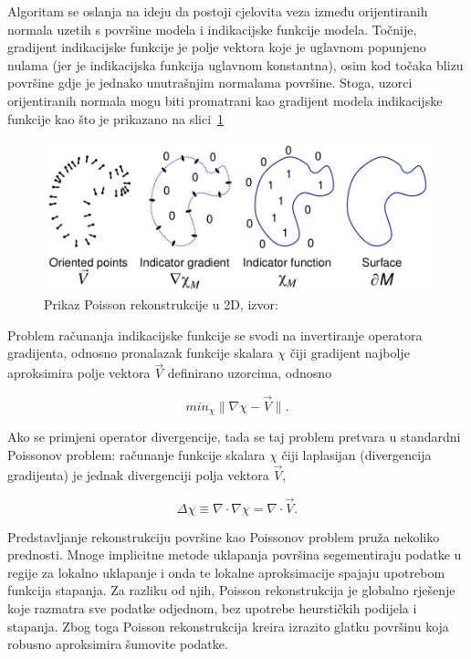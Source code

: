 Algoritam se oslanja na ideju da postoji cjelovita veza između
orijentiranih normala uzetih s površine modela i indikacijske funkcije
modela. Točnije, gradijent indikacijske funkcije je polje vektora koje
je uglavnom popunjeno nulama (jer je indikacijska funkcija uglavnom
konstantna), osim kod točaka blizu površine gdje je jednako unutrašnjim
normalama površine. Stoga, uzorci orijentiranih normala mogu biti
promatrani kao gradijent modela indikacijske funkcije kao što je
prikazano na slici~\ref{fig:poisson-reconstruction.png}

\begin{figure}[h]
\centering
\includegraphics[scale=0.35]{figures/poisson-reconstruction.png}
\caption[]{Prikaz Poisson rekonstrukcije u 2D,
    izvor:~\cite{Kazhdan:2006}}
\label{fig:poisson-reconstruction.png}
\end{figure}

Problem računanja indikacijske funkcije se svodi na invertiranje
operatora gradijenta, odnosno pronalazak funkcije skalara \(\chi\) čiji
gradijent najbolje aproksimira polje vektora \(\vec{V}\) definirano
uzorcima, odnosno 

\begin{equation*}
min_\chi \|\nabla\chi - \vec{V}\|.
\end{equation*}

Ako se primjeni operator divergencije, tada se taj problem pretvara u
standardni Poissonov problem: računanje funkcije skalara \(\chi\) čiji
laplasijan (divergencija gradijenta) je jednak divergenciji polja
vektora \(\vec{V}\),

\begin{equation*}
\Delta \chi \equiv \nabla \cdot \nabla\chi = \nabla \cdot \vec{V}.
\end{equation*}

Predstavljanje rekonstrukciju površine kao Poissonov problem pruža
nekoliko prednosti. Mnoge implicitne metode uklapanja površina
segementiraju podatke u regije za lokalno uklapanje i onda te lokalne
aproksimacije spajaju upotrebom funkcija stapanja. Za razliku od njih,
Poisson rekonstrukcija je globalno rješenje koje razmatra sve podatke
odjednom, bez upotrebe heurstičkih podijela i stapanja. Zbog toga
Poisson rekonstrukcija kreira izrazito glatku površinu koja robusno
aproksimira šumovite podatke.  

